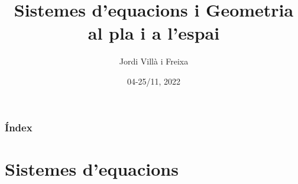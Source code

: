 \documentclass{beamer}
\title[Sistemes d'Equacions]{Sistemes d'equacions i Geometria al pla i a l'espai} %
\author{Jordi Villà i Freixa} %
\institute[FCTE] %
{
Universitat de Vic - Universitat Central de Catalunya \\
Grau en Multimèdia. Aplicacions i Videojocs\\ %
\medskip
\textit{jordi.villa@uvic.cat} %
}
\date{04-25/11, 2022}
\begin{document}
\begin{frame}
\titlepage %
\end{frame}

\begin{frame}
\frametitle{Índex} %
\tableofcontents %
\end{frame}


\section{Sistemes d'equacions} %
\end{document}
